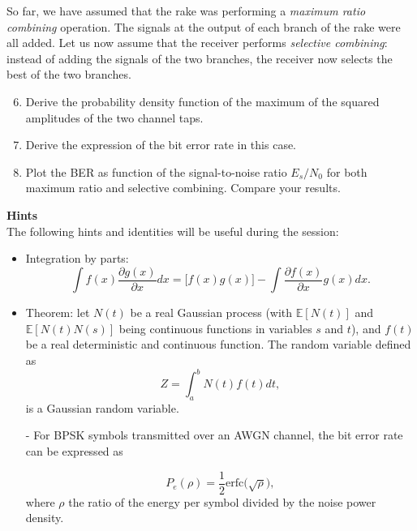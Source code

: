 \documentclass [a4paper, 11pt] {article}
\begin{document}
\begin{exercise}{1}
So far, we have assumed that the rake was performing a \textit{maximum ratio combining} operation. The signals at the output of each branch of the rake were all added. Let us now assume that the receiver performs \textit{selective combining}: instead of adding the signals of the two branches, the receiver now selects the best of the two branches.

\begin{enumerate}
    \setcounter{enumi}{5}
    \item Derive the probability density function of the maximum of the squared amplitudes of the two channel taps.
    \item Derive the expression of the bit error rate in this case.
    \item Plot the BER as function of the signal-to-noise ratio $E_s/N_0$ for both maximum ratio and selective combining. Compare your results.
\end{enumerate}

\newpage



\textbf{Hints}\\

The following hints and identities will be useful during the session:

\begin{itemize}

    \item Integration by parts:
    \begin{equation}\int f(x)\frac{\partial g(x)}{\partial x} dx = \big[f(x)g(x)\big] - \int \frac{\partial f(x)}{\partial x}g(x)dx. \end{equation}
    \item Theorem: let $N(t)$ be a real Gaussian process (with $\mathbb{E}[N(t)]$ and $\mathbb{E}[N(t)N(s)]$ being continuous functions in variables $s$ and $t$), and $f(t)$ be a real deterministic and continuous function. The random variable defined as
	\begin{equation}
	Z = \int_a^b N(t)f(t)dt,
	\end{equation}
	is a Gaussian random variable.
    \item[-] For BPSK symbols transmitted over an AWGN channel, the bit error rate can be expressed as

    \begin{equation}
        P_e(\rho) = \frac{1}{2}\text{erfc}\big(\sqrt{\rho}\big),
    \end{equation}
    where $\rho$ the ratio of the energy per symbol divided by the noise power density.


\end{itemize}
\end{exercise}
\end{document}
